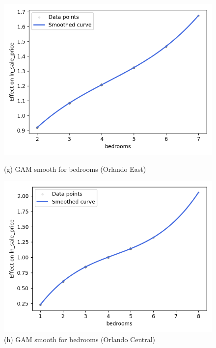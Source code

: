 \begin{figure}[H]
  \centering
  \begin{minipage}[t]{0.48\textwidth}
    \centering
    \includegraphics[width=\linewidth]{Figures/orlando_east_bedrooms_smooth.png}
    \caption*{\small(g) GAM smooth for bedrooms (Orlando East)}
  \end{minipage}
  \hfill
  \begin{minipage}[t]{0.48\textwidth}
    \centering
    \includegraphics[width=\linewidth]{Figures/orlando_central_bedrooms_smooth.png}
    \caption*{\small (h) GAM smooth for bedrooms (Orlando Central)}
  \end{minipage}
\end{figure}


